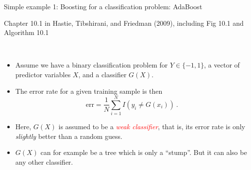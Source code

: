 \documentclass[
  10pt,
  ignorenonframetext,
]{beamer}
\providecommand{\tightlist}{%
  \setlength{\itemsep}{0pt}\setlength{\parskip}{0pt}}
\begin{document}
\begin{frame}
\begin{block}{Simple example 1: Boosting for a classification problem:
AdaBoost}
\protect\hypertarget{simple-example-1-boosting-for-a-classification-problem-adaboost}{}
\tiny

Chapter 10.1 in Hastie, Tibshirani, and Friedman (2009), including Fig
10.1 and Algorithm 10.1

\normalsize

\(~\)

\begin{itemize}
\tightlist
\item
  Assume we have a binary classification problem for \(Y\in \{-1,1\}\),
  a vector of predictor variables \(X\), and a classifier \(G(X)\).
\end{itemize}

\vspace{2mm}

\begin{itemize}
\tightlist
\item
  The error rate for a given training sample is then
  \[\text{err} =\frac{1}{N} \sum_{i=1}^N I(y_i \neq G(x_i)) \ .\]
\end{itemize}

\vspace{2mm}

\begin{itemize}
\tightlist
\item
  Here, \(G(X)\) is assumed to be a
  \emph{\textcolor{red}{weak classifier}}, that is, its error rate is
  only \emph{slightly} better than a random guess.
\end{itemize}

\vspace{2mm}

\begin{itemize}
\tightlist
\item
  \(G(X)\) can for example be a tree which is only a ``stump''. But it
  can also be any other classifier.
\end{itemize}
\end{block}
\end{frame}
\end{document}
